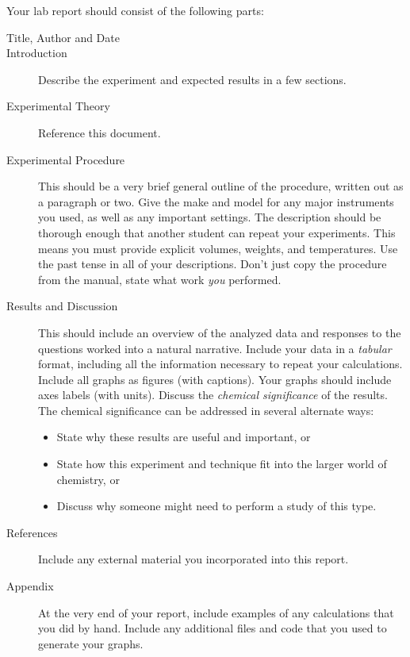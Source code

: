Your lab report should consist of the following parts:
\begin{description}
	\item[Title, Author and Date]
	\item[Introduction] Describe the experiment and expected results in a few sections. 
	\item[Experimental Theory] Reference this document.
	\item[Experimental Procedure] This should be a very brief general outline of the procedure, written out as a paragraph or two. Give the make and model for any major instruments you used, as well as any important settings. The description should be thorough enough that another student can repeat your experiments. This means you must provide explicit volumes, weights, and temperatures. Use the past tense in all of your descriptions. Don't just copy the procedure from the manual, state what work \emph{you} performed. 
	\item[Results and Discussion] This should include an overview of the analyzed data and responses to the questions worked into a natural narrative. 
	Include your data in a \emph{tabular} format, including all the information necessary to repeat your calculations. 
	Include all graphs as figures (with captions). 
	Your graphs should include axes labels (with units). 
	Discuss the \emph{chemical significance} of the results. 
	The chemical significance can be addressed in several alternate ways:
	\begin{itemize}
		\item State why these results are useful and important, or
		\item State how this experiment and technique fit into the larger world of chemistry, or
		\item Discuss why someone might need to perform a study of this type.
	\end{itemize}
	\item[References] Include any external material you incorporated into this report. 
	\item[Appendix] At the very end of your report, include examples of any calculations that you did by hand. 
	Include any additional files and code that you used to generate your graphs.
\end{description}
